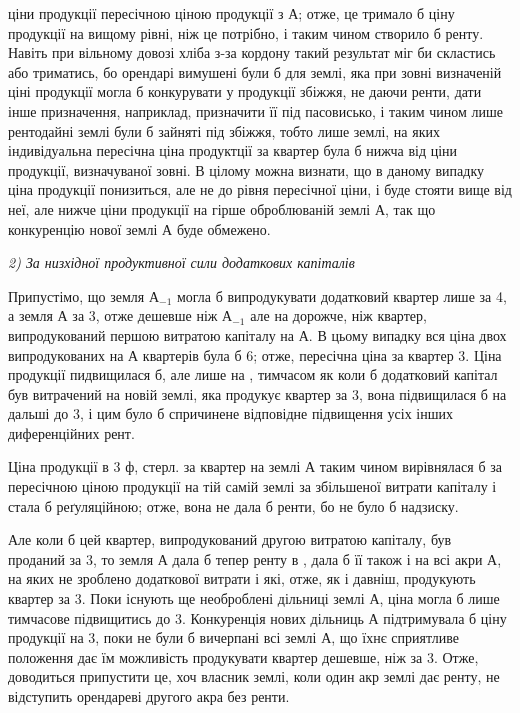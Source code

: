 \parcont{}  %
ціни продукції пересічною ціною продукції з $А$; отже, це тримало б ціну продукції
на вищому рівні, ніж це потрібно, і таким чином створило б ренту.
Навіть при вільному довозі хліба з-за кордону такий результат міг би скластись
або триматись, бо орендарі вимушені були б для землі, яка при зовні
визначеній ціні продукції могла б конкурувати у продукції збіжжя, не даючи
ренти, дати інше призначення, наприклад, призначити її під пасовисько, і таким
чином лише рентодайні землі були б зайняті під збіжжя, тобто лише землі,
на яких індивідуальна пересічна ціна продуктції за квартер була б нижча від
ціни продукції, визначуваної зовні. В цілому можна визнати, що в даному випадку
ціна продукції понизиться, але не до рівня пересічної ціни, і буде стояти
вище від неї, але нижче ціни продукції на гірше оброблюваній землі $А$, так
що конкуренцію нової землі $А$ буде обмежено.

\emph{2) За низхідної продуктивної сили додаткових капіталів}

Припустімо, що земля $А_{-1}$ могла б випродукувати додатковий квартер
лише за 4, а земля $А$ за 3, отже дешевше ніж $А_{-1}$ але на  дорожче, ніж квартер, випродукований першою витратою капіталу на
$А$. В цьому випадку вся ціна двох випродукованих на $А$ квартерів була б \deq{}
6; отже, пересічна ціна за квартер \deq{} 3. Ціна продукції
пидвищилася б, але лише на , тимчасом як коли б додатковий
капітал був витрачений на новій землі, яка продукує квартер за 3, вона підвищилася б на дальші  до 3, і цим
було б спричинене відповідне підвищення усіх інших диференційних рент.

Ціна продукції в 3 ф, стерл. за квартер на землі $А$ таким чином
вирівнялася б за пересічною ціною продукції на тій самій землі за збільшеної
витрати капіталу і стала б реґуляційною; отже, вона не дала б ренти, бо не
було б надзиску.

Але коли б цей квартер, випродукований другою витратою капіталу, був проданий
за 3, то земля $А$ дала б тепер ренту в ,
дала б її також і на всі акри $А$, на яких не зроблено додаткової витрати і
які, отже, як і давніш, продукують квартер за 3. Поки існують ще
необроблені дільниці землі $А$, ціна могла б лише тимчасове підвищитись до
3. Конкуренція нових дільниць $А$ підтримувала б ціну продукції
на 3, поки не були б вичерпані всі землі $А$, що їхнє сприятливе положення
дає їм можливість продукувати квартер дешевше, ніж за 3.
Отже, доводиться припустити це, хоч власник землі, коли один акр землі дає ренту,
не відступить орендареві другого акра без ренти.

